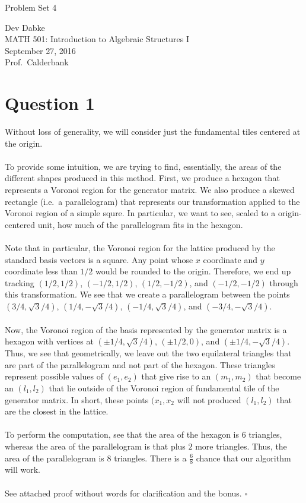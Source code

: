 \documentclass[letterpaper]{article}
\newcommand*{\QED}{\hfill\ensuremath{\square}}%
\def\name{Problem Set 4}
\begin{document}
{\huge \name}


\vspace{0.25in}

Dev Dabke \\
MATH 501: Introduction to Algebraic Structures I \\
September 27, 2016 \\
Prof.\ Calderbank \\

\section{Question 1}
\label{sec:Question1}
Without loss of generality, we will consider just the fundamental tiles centered at the origin.
\\ \\
To provide some intuition, we are trying to find, essentially, the areas of the different shapes produced in this method.
First, we produce a hexagon that represents a Voronoi region for the generator matrix.
We also produce a skewed rectangle (i.e.\ a parallelogram) that represents our transformation applied to the Voronoi region of a simple squre.
In particular, we want to see, scaled to a origin-centered unit, how much of the parallelogram fits in the hexagon.
\\ \\
Note that in particular, the Voronoi region for the lattice produced by the standard basis vectors is a square.
Any point whose $ x $ coordinate and $ y  $ coordinate less than $ 1/2 $ would be rounded to the origin.
Therefore, we end up tracking $ (1/2, 1/2) $, $ (-1/2, 1/2) $, $ (1/2, -1/2) $, and $ (-1/2, -1/2) $ through this transformation.
We see that we create a parallelogram between the points $ (3/4, \sqrt{3}/4) $, $ (1/4, -\sqrt{3}/4) $, $ (-1/4, \sqrt{3}/4) $, and $ (-3/4, -\sqrt{3}/4) $.
\\ \\
Now, the Voronoi region of the basis represented by the generator matrix is a hexagon with vertices at $ (\pm 1/4, \sqrt{3}/4) $, $ (\pm 1/2, 0) $, and $ (\pm 1/4, -\sqrt{3}/4) $.
Thus, we see that geometrically, we leave out the two equilateral triangles that are part of the parallelogram and not part of the hexagon.
These triangles represent possible values of $ (e_1, e_2) $ that give rise to an $ (m_1, m_2) $ that become an $ (l_1, l_2) $ that lie outside of the Voronoi region of fundamental tile of the generator matrix.
In short, these points $ (x_1, x_2 $ will not produced $ (l_1, l_2) $ that are the closest in the lattice.
\\ \\
To perform the computation, see that the area of the hexagon is $ 6 $ triangles, whereas the area of the parallelogram is that plus $ 2 $ more triangles.
Thus, the area of the parallelogram is $ 8 $ triangles.
There is a $ \frac{6}{8} $ chance that our algorithm will work.
\\ \\
See attached proof without words for clarification and the bonus.
\QED{}
\end{document}
